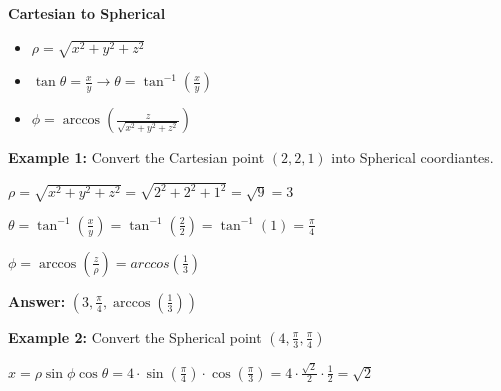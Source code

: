 \documentclass[10pt]{article}                               %
\begin{document}
\begin{defaultbox}
\begin{adjustwidth}{2em}{0pt}
\begin{adjustwidth}{2em}{0pt}
                \textbf{Cartesian to Spherical}

                \begin{itemize}
                    \item \( \rho = \sqrt{x^2 + y^2 + z^2} \)
                    \item \( \tan\theta = \frac{x}{y}  \rightarrow  \theta = \tan^{-1}\left(\frac{x}{y}\right) \)
                    \item \( \phi = \arccos\left(\frac{z}{\sqrt{x^2 + y^2 + z^2}}\right) \)
                \end{itemize}

                \begin{examplebox}
            
                    \textbf{Example 1:} Convert the Cartesian point \( \left(2,2,1\right) \) into Spherical coordiantes.
                    \vspace{0.5em}
    
                    \begin{adjustwidth}{2em}{0pt}
    
                        \( \rho = \sqrt{x^2 + y^2 + z^2} = \sqrt{2^2 + 2^2 + 1^2} = \sqrt{9} = 3 \)
    
                        \( \theta = \tan^{-1}\left(\frac{x}{y}\right) = \tan^{-1}\left(\frac{2}{2}\right) = \tan^{-1}(1) = \frac{\pi}{4} \)
    
                        \( \phi = \arccos\left(\frac{z}{\rho}\right) = arccos\left(\frac{1}{3}\right) \)
    
                        \textbf{Answer:} \( \left(3, \frac{\pi}{4}, \arccos\left(\frac{1}{3}\right)\right) \)
    
                    \end{adjustwidth}
    
                    \vspace{1em}
    
                    \textbf{Example 2:} Convert the Spherical point \( \left(4, \frac{\pi}{3}, \frac{\pi}{4}\right) \)
                    \vspace{0.5em}
    
                    \begin{adjustwidth}{2em}{0pt}
    
                        \( x = \rho\sin\phi\cos\theta = 4 \cdot \sin\left(\frac{\pi}{4}\right) \cdot \cos\left(\frac{\pi}{3}\right) = 4 \cdot \frac{\sqrt{2}}{2} \cdot \frac{1}{2} = \sqrt{2} \)
    

\end{adjustwidth}
\end{examplebox}
\end{adjustwidth}
\end{adjustwidth}
\end{defaultbox}
\end{document}
